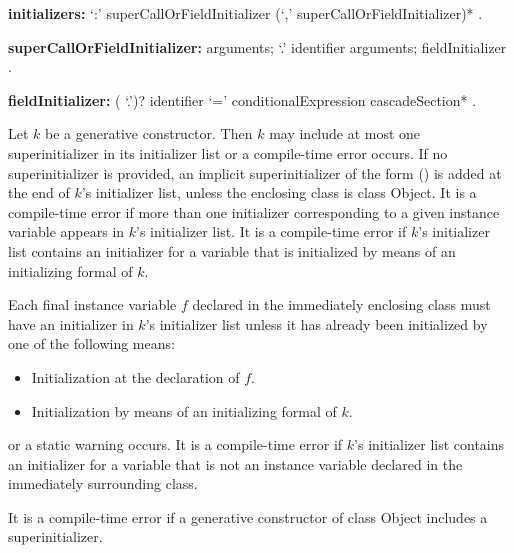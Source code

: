 \documentclass{article}
\newcommand{\code}[1]{{\sf #1}}
\begin{document}
\begin{grammar}
{\bf initializers:}
      `{\escapegrammar :}' superCallOrFieldInitializer (`,' superCallOrFieldInitializer)*
    .


{\bf superCallOrFieldInitializer:}\SUPER{} arguments;
      \SUPER{} `{\escapegrammar .}' identifier arguments;
     fieldInitializer
    .
    
   {\bf  fieldInitializer:}
      (\THIS{} `{\escapegrammar .}')? identifier `=' conditionalExpression cascadeSection*
    .

\end{grammar}

\LMHash{}
Let $k$ be a generative constructor.  Then $k$ may include at most one  superinitializer in its initializer list or a compile-time error occurs. If no superinitializer is provided, an implicit superinitializer of the form \SUPER{}() is added at the end of $k$'s initializer list, unless the enclosing class is class \code{Object}. It is a compile-time error if more than one initializer corresponding to a given instance variable appears in $k$'s initializer list. It is a compile-time error if $k$'s initializer list contains an initializer for a variable that is initialized by means of an initializing formal of $k$. %
 
\LMHash{}
Each final instance variable $f$ declared in the immediately enclosing class must have an initializer in $k$'s initializer list unless it has already been initialized by one of the following means:
 \begin{itemize}
 \item Initialization at the declaration of $f$.
 \item Initialization by  means of an initializing formal of $k$.
 \end{itemize}
 
or a static warning occurs. It is a compile-time error if $k$'s initializer list contains an initializer for a variable that is not an instance variable declared in the immediately surrounding class.

 

\LMHash{}
 It is a compile-time error if a  generative constructor of class \code{Object} includes a superinitializer. 
\end{document}
